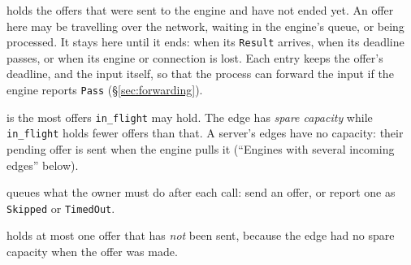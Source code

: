 \documentclass[11pt]{article}
\newcommand{\code}[1]{\texttt{#1}}
\begin{document}
\begin{description}[nosep]
  \item[\code{in\_flight}] holds the offers that were sent to the engine and
        have not ended yet. An offer here may be travelling over the network,
        waiting in the engine's queue, or being processed. It stays here until
        it ends: when its \code{Result} arrives, when its deadline passes, or
        when its engine or connection is lost. Each entry keeps the offer's
        deadline, and the input itself, so that the process can forward the
        input if the engine reports \code{Pass} (\S\ref{sec:forwarding}).
  \item[\code{capacity}] is the most offers \code{in\_flight} may hold. The
        edge has \emph{spare capacity} while \code{in\_flight} holds fewer
        offers than that. A server's edges have no capacity: their pending
        offer is sent when the engine pulls it (``Engines with several
        incoming edges'' below).
  \item[\code{actions}] queues what the owner must do after each call:
        send an offer, or report one as \code{Skipped} or \code{TimedOut}.
  \item[\code{pending}] holds at most one offer that has \emph{not} been sent,
        because the edge had no spare capacity when the offer was made.
\end{description}
\end{document}
